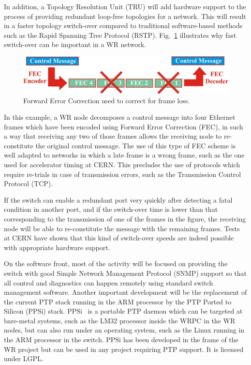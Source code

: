 \documentclass{../JAC2003}
\begin{document}
In addition, a Topology Resolution Unit (TRU) will add hardware
support to the process of providing redundant loop-free topologies for
a network. This will result in a faster topology switch-over compared
to traditional software-based methods such as the Rapid Spanning Tree
Protocol (RSTP). Fig.~\ref{fec-fig} illustrates why fast switch-over
can be important in a WR network.

\begin{figure}[htb]
   \centering
   \includegraphics*[width=\columnwidth]{robustness/FEC.pdf}
   \caption{Forward Error Correction used to correct for frame loss.}
   \label{fec-fig}
\end{figure}

In this example, a WR node decomposes a control message into four
Ethernet frames which have been encoded using Forward Error Correction
(FEC), in such a way that receiving any two of those frames allows the
receiving node to re-constitute the original control message. The use
of this type of FEC scheme is well adapted to networks in which a late
frame is a wrong frame, such as the one used for accelerator timing at
CERN. This precludes the use of protocols which require re-trials in
case of transmission errors, such as the Transmission Control Protocol
(TCP).

If the switch can enable a redundant port very quickly after detecting
a fatal condition in another port, and if the switch-over time is
lower than that corresponding to the transmission of one of the frames
in the figure, the receiving node will be able to re-constitute the
message with the remaining frames. Tests at CERN have shown that this
kind of switch-over speeds are indeed possible with appropriate
hardware support.

On the software front, most of the activity will be focused on
providing the switch with good Simple Network Management Protocol
(SNMP) support so that all control and diagnostics can happen remotely
using standard switch management software. Another important
development will be the replacement of the current PTP stack running
in the ARM processor by the PTP Ported to Silicon (PPSi)
stack. PPSi~\cite{ppsi-ref} is a portable PTP daemon which can be
targeted at bare-metal systems, such as the LM32 processor inside the
WRPC in the WR nodes, but can also run under an operating system, such
as the Linux running in the ARM processor in the switch. PPSi has been
developed in the frame of the WR project but can be used in any
project requiring PTP support. It is licensed under LGPL. 
\end{document}
